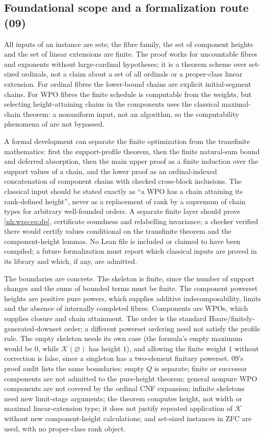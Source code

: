 \documentclass[11pt,a4paper]{article}
\theoremstyle{definition}
\theoremstyle{remark}
\newcommand{\K}{\mathcal K}
\begin{document}
\subsection{Foundational scope and a formalization route (09)}\label{nh:wpo:sec:foundations}

All inputs of an instance are sets; the fibre family, the set of component
heights and the set of linear extensions are finite. The proof works for
uncountable fibres and exponents without large-cardinal hypotheses; it is a
theorem scheme over set-sized ordinals, not a claim about a set of all ordinals
or a proper-class linear extension. For ordinal fibres the lower-bound chains are
explicit initial-segment chains. For WPO fibres the finite schedule is computable
from the weights, but selecting height-attaining chains in the components uses
the classical maximal-chain theorem: a nonuniform input, not an algorithm, so the
computability phenomena of \cite{MMS2012} are not bypassed.

A formal development can separate the finite optimization from the transfinite
mathematics: first the support-profile theorem, then the finite natural-sum bound
and deferred absorption, then the main upper proof as a finite induction over the
support values of a chain, and the lower proof as an ordinal-indexed
concatenation of component chains with checked cross-block inclusions. The
classical input should be stated exactly as ``a WPO has a chain attaining its
rank-defined height'', never as a replacement of rank by a supremum of chain types
for arbitrary well-founded orders. A separate finite layer should prove
\eqref{nh:wpo:eq:dp}, certificate soundness and relabelling invariance; a checker
verified there would certify values conditional on the transfinite theorem and the
component-height lemmas. No Lean file is included or claimed to have been
compiled; a future formalization must report which classical inputs are proved in
its library and which, if any, are admitted.

The boundaries are concrete. The skeleton is finite, since the number of support
changes and the sums of bounded terms must be finite. The component powerset
heights are positive pure powers, which supplies additive indecomposability,
limits and the absence of internally completed fibres. Components are WPOs, which
supplies closure and chain attainment. The order is the standard
Hoare/finitely-generated-downset order; a different powerset ordering need not
satisfy the profile rule. The empty skeleton needs its own case (the formula's
empty maximum would be $0$, while $\K(\varnothing)$ has height $1$), and allowing
the finite weight $1$ without correction is false, since a singleton has a
two-element finitary powerset. 09's proof audit lists the same boundaries: empty
$Q$ is separate; finite or successor components are not admitted to the
pure-height theorem; general nonpure WPO components are not covered by the
ordinal CNF expansion; infinite skeletons need new limit-stage arguments; the
theorem computes height, not width or maximal linear-extension type; it does not
justify repeated application of $\K$ without new component-height calculations;
and set-sized instances in ZFC are used, with no proper-class rank object.
\end{document}
